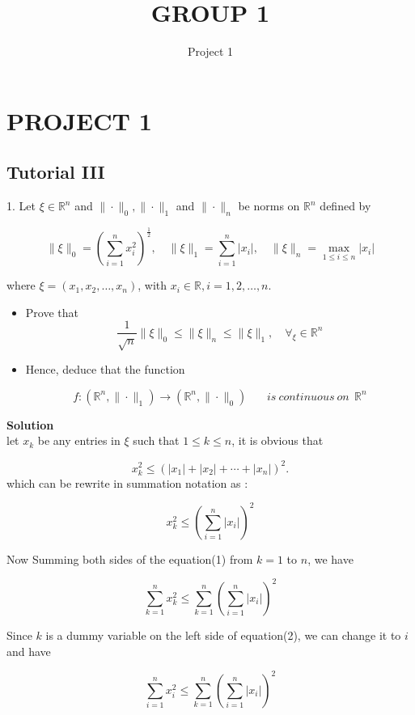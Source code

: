 \documentclass{article}
\title{GROUP 1}
\author{Project 1}
\begin{document}
\section{PROJECT 1}
\subsection{Tutorial III}
\large{}
1. Let $\xi \in \mathbb{R}^{n}$ and $\|\cdot\|_{0},\|\cdot\|_{1}$ and $\|\cdot\|_{n}$ be norms on $\mathbb{R}^{n}$ defined by

$$
\|\xi\|_{0}=\left(\sum_{i=1}^{n} x_{i}^{2}\right)^{\frac{1}{2}}, \quad\|\xi\|_{1}=\sum_{i=1}^{n}\left|x_{i}\right|, \quad\|\xi\|_{n}=\max _{1 \leq i \leq n}\left|x_{i}\right|
$$

where $\xi=\left(x_{1}, x_{2}, \ldots, x_{n}\right)$, with $x_{i} \in \mathbb{R}, i=1,2, \ldots, n$.
\begin{itemize}
    \item Prove that
$$
\frac{1}{\sqrt{n}}\|\xi\|_{0} \leq\|\xi\|_{n} \leq\|\xi\|_{1}, \quad \forall_{\xi} \in \mathbb{R}^{n}
$$
\item Hence, deduce that the function

$$
f:\left(\mathbb{R}^{n},\|\cdot\|_{1}\right) \longrightarrow\left(\mathbb{R}^{n},\|\cdot\|_{0}\right)~~~~~~~~is ~continuous~ on ~~\mathbb{R}^{n}
$$
\end{itemize}

\textbf{Solution}\\

let $x_k$ be any entries in $\xi$ such that $1 \leq k \leq n$, it is obvious that

$$
x_{k}^{2} \leq\left(\left|x_{1}\right|+\left|x_{2}\right|+\cdots+\left|x_{n}\right|\right)^{2} .
$$
which can be rewrite in summation notation as :

$$\begin{equation}
x_{k}^{2} \leq \left(\sum_{i=1}^{n}\left|x_{i}\right|\right)^{2}
\end{equation}$$

Now Summing both sides of the equation(1) from $k=1$ to $n$, we have

$$\begin{equation}
\sum_{k=1}^{n} x_{k}^{2} \leq \sum_{k=1}^{n}\left(\sum_{i=1}^{n}\left|x_{i}\right|\right)^{2}
\end{equation}$$

Since $k$ is a dummy variable on the left side of equation(2), we can change it to $i$ and have

$$
\sum_{i=1}^{n} x_{i}^{2} \leq \sum_{k=1}^{n}\left(\sum_{i=1}^{n}\left|x_{i}\right|\right)^{2}
$$
\end{document}

